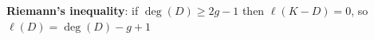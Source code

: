 \documentclass[preview]{standalone}
\begin{document}
\begin{center}
\textbf{Riemann's inequality}: if $\deg(D)\geq 2g-1$ then $\ell(K-D)=0$, so $\ell(D)=\deg(D)-g+1$
\end{center}
\end{document}

